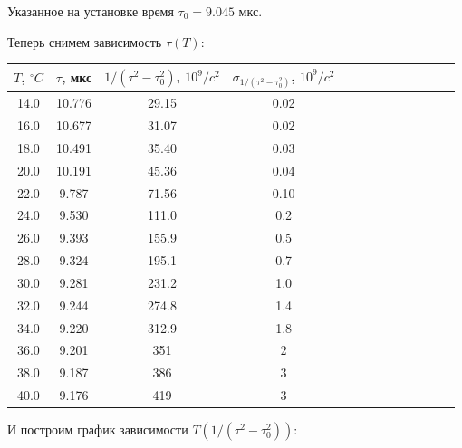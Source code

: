 \documentclass[14pt]{article}
\begin{document}
Указанное на установке время $\tau_0 = 9.045$ мкс.

\vspace{1cm}
Теперь снимем зависимость $\tau(T)$:

\begin{center}
\begin{tabular}{|c|c|c|c|c|c|c|c|c|c|c|c|c|}
\hline
$T$, $^\circ C$		&	$\tau$, мкс		&	$1/(\tau^2 - \tau_0^2)$, $10^9/c^2$	&	$\sigma_{1/(\tau^2 - \tau_0^2)}$, $10^9/c^2$	\\
\hline
14.0				&	10.776			&	29.15									&	0.02											\\
\hline
16.0				&	10.677			&	31.07									&	0.02											\\
\hline
18.0				&	10.491			&	35.40									&	0.03											\\
\hline
20.0				&	10.191			&	45.36									&	0.04											\\
\hline
22.0				&	9.787			&	71.56									&	0.10											\\
\hline
24.0				&	9.530			&	111.0									&	0.2												\\
\hline
26.0				&	9.393			&	155.9									&	0.5												\\
\hline
28.0				&	9.324			&	195.1									&	0.7												\\
\hline
30.0				&	9.281			&	231.2									&	1.0												\\
\hline
32.0				&	9.244			&	274.8									&	1.4												\\
\hline
34.0				&	9.220			&	312.9									&	1.8												\\
\hline
36.0				&	9.201			&	351										&	2												\\
\hline
38.0				&	9.187			&	386										&	3												\\
\hline
40.0				&	9.176			&	419										&	3												\\
\hline
\end{tabular}
\end{center}


И построим график зависимости $T(1/(\tau^2 - \tau_0^2))$:
\end{document}
